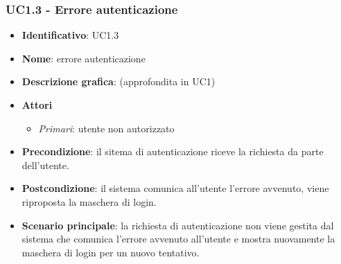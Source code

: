 \subsubsection{UC1.3 - Errore autenticazione}
\begin{itemize}
  \item \textbf{Identificativo}: UC1.3
  \item \textbf{Nome}: errore autenticazione
  \item \textbf{Descrizione grafica}: (approfondita in UC1)
  \item \textbf{Attori}
        \begin{itemize}
          \item \textit{Primari}: utente non autorizzato
        \end{itemize}
  \item \textbf{Precondizione}: il sitema di autenticazione riceve la richiesta da parte dell'utente.
  \item \textbf{Postcondizione}: il sistema comunica all'utente l'errore avvenuto, viene riproposta la maschera di login.
  \item \textbf{Scenario principale}: la richiesta di autenticazione non viene gestita dal sistema che comunica l'errore avvenuto all'utente e mostra nuovamente la maschera di login per un nuovo tentativo.
\end{itemize}

